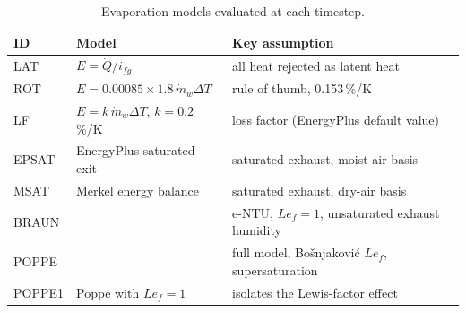 \documentclass[preprint,12pt]{elsarticle}
\begin{document}
\begin{table}[t]\centering\small
\caption{Evaporation models evaluated at each timestep.}\label{tab:methods}
\begin{tabular}{lll}\toprule
ID & Model & Key assumption \\\midrule
LAT & $E=\dot Q/i_{fg}$ & all heat rejected as latent heat \\
ROT & $E = 0.00085\times1.8\,\dot m_w\Delta T$ & rule of thumb, 0.153\,\%/K \citep{green2008perrys} \\
LF & $E = k\,\dot m_w\Delta T$, $k=0.2$\,\%/K & loss factor (EnergyPlus default value) \\
EPSAT & EnergyPlus saturated exit & saturated exhaust, moist-air basis \\
MSAT & Merkel energy balance & saturated exhaust, dry-air basis \\
BRAUN & \citet{braun1989effectiveness} & e-NTU, $Le_f=1$, unsaturated exhaust humidity \\
POPPE & \citet{poppe1991berechnung,kloppers2005critical} & full model, Bo\v{s}njakovi\'c $Le_f$, supersaturation \\
POPPE1 & Poppe with $Le_f=1$ & isolates the Lewis-factor effect \\\bottomrule
\end{tabular}
\end{table}
\end{document}
